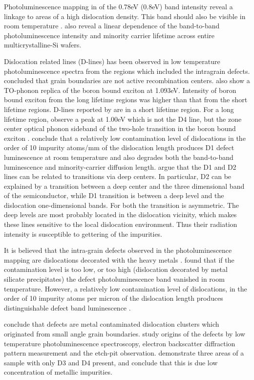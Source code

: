 Photoluminescence mapping in \cite{tarasov00} of the 0.78eV (0.8eV) band intensity reveal a linkage to areas of a high dislocation density. This band should also be visible in room temperature \cite{tarasov00}. \cite{tarasov00} also reveal a linear dependence of the band-to-band photoluminescence intensity and minority carrier lifetime across entire multicrystalline-Si wafers.

Dislocation related lines (D-lines) has been observed in low temperature photoluminescence spectra from the regions which included the intragrain defects. \cite{sugimoto06} concluded that grain boundaries are not active recombination centers. \cite{sugimoto06} also show a TO-phonon replica of the boron bound exciton at 1.093eV. Intensity of boron bound exciton from the long lifetime regions was higher than that from the short lifetime regions. D-lines reported by \cite{sauer85} are in a short lifetime region. For a long lifetime region, \cite{sugimoto06} observe a peak at 1.00eV which is not the D4 line, but the zone center optical phonon sideband of the two-hole transition in the boron bound exciton \cite{dean67}. \cite{kitler02} conclude that a relatively low contamination level of dislocations in the order of 10 impurity atoms/mm of the dislocation length produces D1 defect luminescence at room temperature and also degrades both the band-to-band luminescence and minority-carrier diffusion length. \cite{arguirov07} argue that the D1 and D2 lines can be related to transitions via deep centers. In particular, D2 can be explained by a transition between a deep center and the three dimensional band of the semiconductor, while D1 transition is between a deep level and the dislocation one-dimensional bands. For both the transition is asymmetric. The deep levels are most probably located in the dislocation vicinity, which makes these lines sensitive to the local dislocation environment. Thus their radiation intensity is susceptible to gettering of the impurities.

It is believed that the intra-grain defects observed in the photoluminescence mapping are dislocations decorated with the heavy metals \cite{sugimoto06}. \cite{tarasov01} found that if the contamination level is too low, or too high (dislocation decorated by metal silicate precipitates) the defect photoluminescence band vanished in room temperature. However, a relatively low contamination level of dislocations, in the order of 10 impurity atoms per micron of the dislocation length produces distinguishable defect band luminescence \cite{tarasov01,kitler02}. 

\cite{sugimoto07} conclude that defects are metal contaminated dislocation clusters which originated from small angle grain boundaries. \cite{sugimoto07} study origins of the defects by low temperature photoluminescence spectroscopy, electron backscatter diffraction pattern measurement and the etch-pit observation. \cite{arguirov07} demonstrate three areas of a sample with only D3 and D4 present, and conclude that this is due low concentration of metallic impurities.
